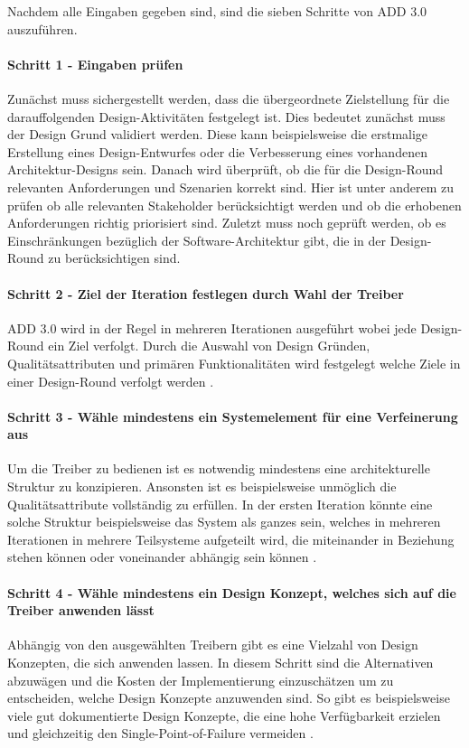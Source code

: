 Nachdem alle Eingaben gegeben sind, sind die sieben Schritte von ADD 3.0 auszuführen.\\

\paragraph{Schritt 1 - Eingaben prüfen}
Zunächst muss sichergestellt werden, dass die übergeordnete Zielstellung für die darauffolgenden Design-Aktivitäten festgelegt ist. Dies bedeutet zunächst muss der Design Grund validiert werden. Diese kann beispielsweise die erstmalige Erstellung eines Design-Entwurfes oder die Verbesserung eines vorhandenen Architektur-Designs sein. Danach wird überprüft, ob die für die Design-Round relevanten Anforderungen und Szenarien korrekt sind. Hier ist unter anderem zu prüfen ob alle relevanten Stakeholder berücksichtigt werden und ob die erhobenen Anforderungen richtig priorisiert sind. Zuletzt muss noch geprüft werden, ob es Einschränkungen bezüglich der Software-Architektur gibt, die in der Design-Round zu berücksichtigen sind.\\

\paragraph{Schritt 2 - Ziel der Iteration festlegen durch Wahl der Treiber}
ADD 3.0 wird in der Regel in mehreren Iterationen ausgeführt wobei jede Design-Round ein Ziel verfolgt. Durch die Auswahl von Design Gründen, Qualitätsattributen und primären Funktionalitäten wird festgelegt welche Ziele in einer Design-Round verfolgt werden \cite{add3}.\\

\paragraph{Schritt 3 - Wähle mindestens ein Systemelement für eine Verfeinerung aus}
Um die Treiber zu bedienen ist es notwendig mindestens eine architekturelle Struktur zu konzipieren. Ansonsten ist es beispielsweise unmöglich die Qualitätsattribute vollständig zu erfüllen. In der ersten Iteration könnte eine solche Struktur beispielsweise das System als ganzes sein, welches in mehreren Iterationen in mehrere Teilsysteme aufgeteilt wird, die miteinander in Beziehung stehen können oder voneinander abhängig sein können \cite{add3}.\\

\paragraph{Schritt 4 - Wähle mindestens ein Design Konzept, welches sich auf die Treiber anwenden lässt}
Abhängig von den ausgewählten Treibern gibt es eine Vielzahl von Design Konzepten, die sich anwenden lassen. In diesem Schritt sind die Alternativen abzuwägen und die Kosten der Implementierung einzuschätzen um zu entscheiden, welche Design Konzepte anzuwenden sind. So gibt es beispielsweise viele gut dokumentierte Design Konzepte, die eine hohe Verfügbarkeit erzielen und gleichzeitig den Single-Point-of-Failure vermeiden \cite{add3}.\\

